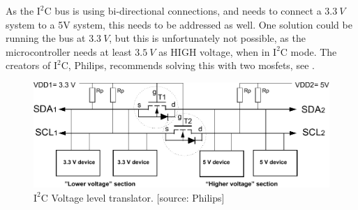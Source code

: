 As the $\text{I}^2\text{C}$ bus is using bi-directional connections, and needs to connect a $\SI{3,3}{V}$ system to a 5V system, this needs to be addressed as well. One solution could be running the bus at $\SI{3,3}{V}$, but this is unfortunately not possible, as the microcontroller needs at least $\SI{3,5}{V}$ as HIGH voltage, when in  $\text{I}^2\text{C}$ mode. The creators of $\text{I}^2\text{C}$, Philips, recommends solving this with two mosfets, see .

\begin{figure}[H]
	\centering
	\includegraphics[scale=0.9]{figures/i2cLevel.pdf}
	\caption{$\text{I}^2\text{C}$ Voltage level translator. [source: Philips]}
	\label{i2clevel}
\end{figure}

